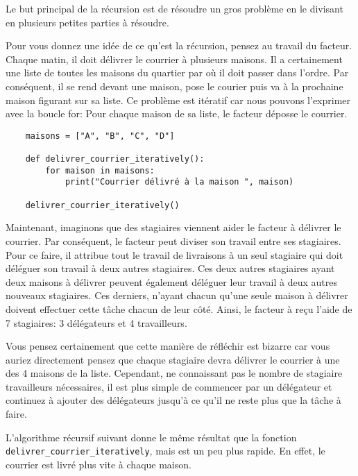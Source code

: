 Le but principal de la récursion est de résoudre un gros problème en le divisant en plusieurs petites parties à résoudre.

Pour vous donnez une idée de ce qu'est la récursion, pensez au travail du facteur. Chaque matin, il doit délivrer le courrier à plusieurs maisons. Il a certainement une liste de toutes les maisons du quartier par où il doit passer dans l'ordre. Par conséquent, il se rend devant une maison, pose le courier puis va à la prochaine maison figurant sur sa liste. Ce problème est itératif car nous pouvons l'exprimer avec la boucle for: Pour chaque maison de sa liste, le facteur déposse le courrier. 

\begin{verbatim}
    maisons = ["A", "B", "C", "D"]

    def delivrer_courrier_iteratively():
        for maison in maisons:
            print("Courrier délivré à la maison ", maison)
            
    delivrer_courrier_iteratively()
\end{verbatim}

Maintenant, imaginons que des stagiaires viennent aider le facteur à délivrer le courrier. Par conséquent, le facteur peut diviser son travail entre ses stagiaires. Pour ce faire, il attribue tout le travail de livraisons à un seul stagiaire qui doit déléguer son travail à deux autres stagiaires. Ces deux autres stagiaires ayant deux maisons à délivrer peuvent également déléguer leur travail à deux autres nouveaux stagiaires. Ces derniers, n'ayant chacun qu'une seule maison à délivrer doivent effectuer cette tâche chacun de leur côté. Ainsi, le facteur à reçu l'aide de 7 stagiaires: 3 délégateurs et 4 travailleurs. 

Vous pensez certainement que cette manière de réfléchir est bizarre car vous auriez directement pensez que chaque stagiaire devra délivrer le courrier à une des 4 maisons de la liste. Cependant, ne connaissant pas le nombre de stagiaire travailleurs nécessaires, il est plus simple de commencer par un délégateur et continuez à ajouter des délégateurs jusqu'à ce qu'il ne reste plus que la tâche à faire. 

L'algorithme récursif suivant donne le même résultat que la fonction \lstinline{delivrer_courrier_iteratively}, mais est un peu plus rapide. En effet, le courrier est livré plus vite à chaque maison. 


